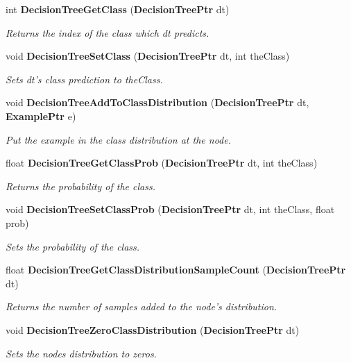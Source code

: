 \begin{CompactItemize}
int {\bf Decision\-Tree\-Get\-Class} ({\bf Decision\-Tree\-Ptr} dt)
\begin{CompactList}\small\item\em Returns the index of the class which dt predicts. \item\end{CompactList}\item 
void {\bf Decision\-Tree\-Set\-Class} ({\bf Decision\-Tree\-Ptr} dt, int the\-Class)
\begin{CompactList}\small\item\em Sets dt's class prediction to the\-Class. \item\end{CompactList}\item 
void {\bf Decision\-Tree\-Add\-To\-Class\-Distribution} ({\bf Decision\-Tree\-Ptr} dt, {\bf Example\-Ptr} e)
\begin{CompactList}\small\item\em Put the example in the class distribution at the node. \item\end{CompactList}\item 
float {\bf Decision\-Tree\-Get\-Class\-Prob} ({\bf Decision\-Tree\-Ptr} dt, int the\-Class)
\begin{CompactList}\small\item\em Returns the probability of the class. \item\end{CompactList}\item 
void {\bf Decision\-Tree\-Set\-Class\-Prob} ({\bf Decision\-Tree\-Ptr} dt, int the\-Class, float prob)
\begin{CompactList}\small\item\em Sets the probability of the class. \item\end{CompactList}\item 
float {\bf Decision\-Tree\-Get\-Class\-Distribution\-Sample\-Count} ({\bf Decision\-Tree\-Ptr} dt)
\begin{CompactList}\small\item\em Returns the number of samples added to the node's distribution. \item\end{CompactList}\item 
void {\bf Decision\-Tree\-Zero\-Class\-Distribution} ({\bf Decision\-Tree\-Ptr} dt)
\begin{CompactList}\small\item\em Sets the nodes distribution to zeros. \item\end{CompactList}\item 

\end{CompactItemize}
